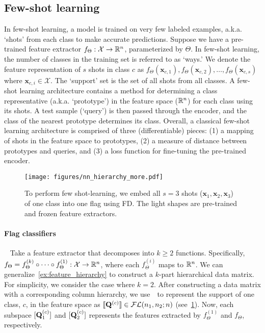 \subsection{Few-shot learning}
In few-shot learning, a model is trained on very few labeled examples, a.k.a. `shots' from each class to make accurate predictions. 
Suppose we have a pre-trained feature extractor $f_\Theta: \mathcal{X} \rightarrow \mathbb{R}^{n}$, parameterized by $\Theta$. 
In few-shot learning, the number of classes in the training set is referred to as `ways.' We denote the feature representation of $s$ shots in class $c$ as $f_\Theta(\bm{x}_{c,1}),f_\Theta(\bm{x}_{c,2}),\dots, f_\Theta(\bm{x}_{c,s})$ where $\bm{x}_{c,i} \in \mathcal{X}$. The `support' set is the set of all shots from all classes. A few-shot learning architecture contains a method for determining a class representative (a.k.a. `prototype') in the feature space ($\mathbb{R}^n$) for each class using its shots. A test sample (`query') is then passed through the encoder, and the class of the nearest prototype determines its class. Overall, a classical few-shot learning architecture is comprised of three (differentiable) pieces: (1) a mapping of shots in the feature space to prototypes, (2) a measure of distance between prototypes and queries, and (3) a loss function for fine-tuning the pre-trained encoder.


\begin{figure}[t]
        \centering
        \texttt{[image: figures/nn\_hierarchy\_more.pdf]}
        \caption{To perform few shot-learning, we embed all $s=3$ shots ($\bm{x}_1, \bm{x}_2, \bm{x}_3$) of one class into one flag using FD. The light shapes are pre-trained and frozen feature extractors.}
        \label{fig:fewshot_flags}
    \end{figure}
\paragraph{Flag classifiers}~\label{sec:fewshot_flags} 
Take a feature extractor that decomposes into $k \geq 2$ functions. Specifically, $f_{\Theta} = f_{\Theta}^{(k)} \circ \cdots \circ f_{\Theta}^{(1)}:\mathcal{X} \rightarrow \mathbb{R}^n$,
where each $f_{\Theta}^{(i)}$ maps to $\mathbb{R}^n$.
We can generalize~\cref{ex:feature_hierarchy} to construct a $k$-part hierarchical data matrix. For simplicity, we consider the case where $k =2$. After constructing a data matrix with a corresponding column hierarchy, we use~\algname~to represent the support of one class, $c$, in the feature space as $[\![\mathbf{Q}^{(c)}]\!]\in \mathcal{FL}(n_1,n_2; n)$ (see~\cref{fig:fewshot_flags}). Now, each subspace $[\mathbf{Q}^{(c)}_1]$ and $[\mathbf{Q}^{(c)}_2]$ represents the features extracted by $f_{\Theta}^{(1)}$ and $f_{\Theta}$, respectively.

